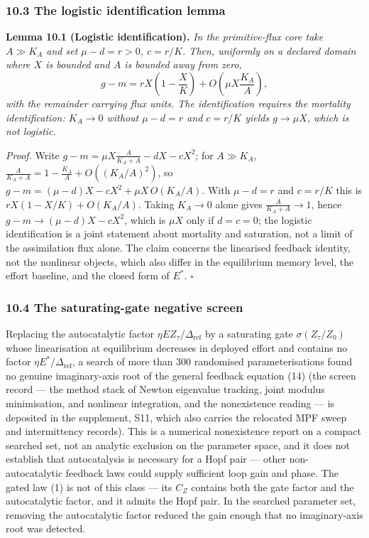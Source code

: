 \documentclass[11pt]{article}
\begin{document}
\subsubsection{10.3 The logistic identification
lemma}\label{the-logistic-identification-lemma}

\textbf{Lemma 10.1 (Logistic identification).} \emph{In the
primitive-flux core take \(A \gg K_A\) and set \(\mu - d = r > 0\),
\(c = r/K\). Then, uniformly on a declared domain where \(X\) is bounded
and \(A\) is bounded away from zero,}
\[g - m = rX\left(1 - \frac{X}{K}\right) + O\left(\mu X \frac{K_A}{A}\right),\]
\emph{with the remainder carrying flux units. The identification
requires the mortality identification: \(K_A \to 0\) without
\(\mu - d = r\) and \(c = r/K\) yields \(g \to \mu X\), which is not
logistic.}

\emph{Proof.} Write \(g - m = \mu X \frac{A}{K_A + A} - dX - cX^2\); for
\(A \gg K_A\), \(\frac{A}{K_A + A} = 1 - \frac{K_A}{A} + O((K_A/A)^2)\),
so \(g - m = (\mu - d)X - cX^2 + \mu X\,O(K_A/A)\). With \(\mu - d = r\)
and \(c = r/K\) this is \(rX(1 - X/K) + O(K_A/A)\). Taking \(K_A \to 0\)
alone gives \(\frac{A}{K_A + A} \to 1\), hence
\(g - m \to (\mu - d)X - cX^2\), which is \(\mu X\) only if
\(d = c = 0\); the logistic identification is a joint statement about
mortality and saturation, not a limit of the assimilation flux alone.
The claim concerns the linearised feedback identity, not the nonlinear
objects, which also differ in the equilibrium memory level, the effort
baseline, and the closed form of \(E^*\). \ensuremath{\square}

\subsubsection{10.4 The saturating-gate negative
screen}\label{the-saturating-gate-negative-screen}

Replacing the autocatalytic factor
\(\eta E Z_\tau/\Delta_{\mathrm{ref}}\) by a saturating gate
\(\sigma(Z_\tau/Z_0)\) whose linearisation at equilibrium decreases in
deployed effort and contains no factor
\(\eta E^*/\Delta_{\mathrm{ref}}\), a search of more than 300 randomised
parameterisations found no genuine imaginary-axis root of the general
feedback equation (14) (the screen record --- the method stack of Newton
eigenvalue tracking, joint modulus minimisation, and nonlinear
integration, and the nonexistence reading --- is deposited in the
supplement, S11, which also carries the relocated MPF sweep and
intermittency records). This is a numerical nonexistence report on a
compact searched set, not an analytic exclusion on the parameter space,
and it does not establish that autocatalysis is necessary for a Hopf
pair --- other non-autocatalytic feedback laws could supply sufficient
loop gain and phase. The gated law (1) is not of this class --- its
\(C_Z\) contains both the gate factor and the autocatalytic factor, and
it admits the Hopf pair. In the searched parameter set, removing the
autocatalytic factor reduced the gain enough that no imaginary-axis root
was detected.
\end{document}
